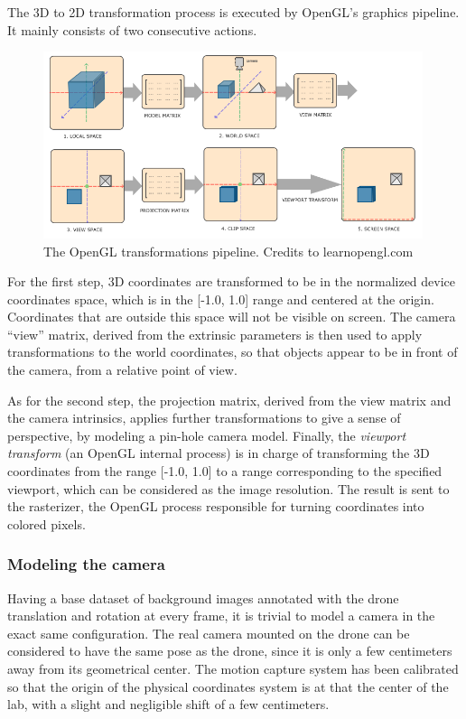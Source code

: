 The 3D to 2D transformation process is executed by OpenGL's graphics pipeline.
It mainly consists of two consecutive actions.

\begin{figure}[h]
	\center
	\includegraphics[width=0.99\textwidth]{figure/pipeline.png}
	\caption[OpenGL transformations pipeline]{The OpenGL transformations
	pipeline. Credits to learnopengl.com~\cite{LearnOpenGL} }
	\label{fig:openglpipeline}
\end{figure}

For the first step, 3D coordinates are transformed to be in the normalized
device coordinates space, which is in the [-1.0, 1.0] range and centered at the
origin. Coordinates that are outside this space will not be visible on screen.
The camera ``view'' matrix, derived from the extrinsic parameters is then used
to apply transformations to the world coordinates, so that objects appear to be
in front of the camera, from a relative point of view.

As for the second step, the projection matrix, derived from the view matrix and
the camera intrinsics, applies further transformations to give a sense of
perspective, by modeling a pin-hole camera model. Finally, the \emph{viewport
transform} (an OpenGL internal process) is in charge of transforming the 3D
coordinates from the range [-1.0, 1.0] to a range corresponding to the
specified viewport, which can be considered as the image resolution. The result
is sent to the rasterizer, the OpenGL process responsible for turning
coordinates into colored pixels.


	\subsubsection{Modeling the camera}

Having a base dataset of background images annotated with the drone translation
and rotation at every frame, it is trivial to model a camera in the exact same
configuration. The real camera mounted on the drone can be considered to have
the same pose as the drone, since it is only a few centimeters away from its
geometrical center. The motion capture system has been calibrated so that the
origin of the physical coordinates system is at that the center of the lab,
with a slight and negligible shift of a few centimeters.\\

